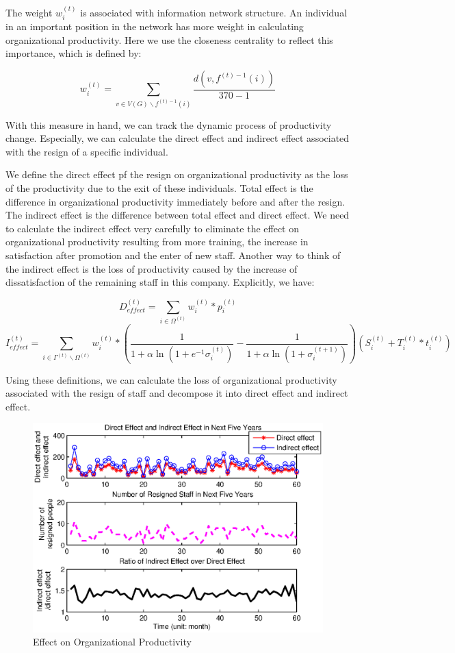 \documentclass[tcn = 37075, sheet = true, abstract = true]{mcmthesis}
\begin{document}
The weight $w_i^{(t)}$ is associated with information network structure. An individual in an important position in the network has more weight in calculating organizational productivity. Here we use the closeness centrality to reflect this importance, which is defined by:

$$\displaystyle w_i^{(t)}=\sum\limits_{v\in V(G)\backslash f^{(t)-1}(i)}\frac{d(v,f^{(t)-1}(i))}{370-1}$$

With this measure in hand, we can track the dynamic process of productivity change. Especially, we can calculate the direct effect and indirect effect associated with the resign of a specific individual.

We define the direct effect pf the resign on organizational productivity as the loss of the productivity due to the exit of these individuals. Total effect is the difference in organizational productivity immediately before and after the resign. The indirect effect is the difference between total effect and direct effect. We need to calculate the indirect effect very carefully to eliminate the effect on organizational productivity resulting from more training, the increase in satisfaction after promotion and the enter of new staff. Another way to think of the indirect effect is the loss of productivity caused by the increase of dissatisfaction of the remaining staff in this company. Explicitly, we have:

$$D^{(t)}_{effect}=\sum\limits_{i\in\Omega^{(t)}}w_i^{(t)}*p_i^{(t)}$$ $$I^{(t)}_{effect}=\sum\limits_{i\in\Gamma^{(t)}\backslash\Omega^{(t)}} w_i^{(t)}*(\frac{1}{1+\alpha\ln{(1+e^{-1}\sigma_i^{(t)})}}-\frac{1}{1+\alpha\ln{(1+\sigma_i^{(t+1)})}})(S_i^{(t)}+T_i^{(t)}*t_i^{(t)})$$

Using these definitions, we can calculate the loss of organizational productivity associated with the resign of staff and decompose it into direct effect and indirect effect. 

\begin{figure}[htb!]
\centering
\includegraphics[width=14cm]{Productivity_figure.eps}
\caption{Effect on Organizational Productivity} 
\label{fig:3}
\end{figure}
\end{document}
